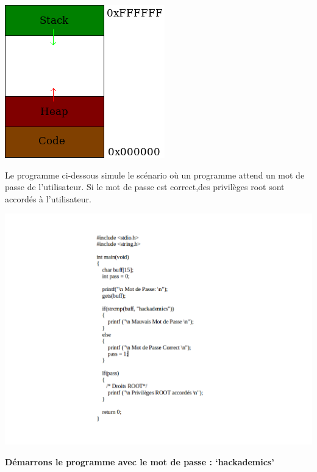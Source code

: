 \begin{center}
\includegraphics[scale=0.5]{Application/assets/stack.png}
\end{center}

\begin{flushleft}
Le programme ci-dessous simule le scénario où un programme attend un mot de passe de l'utilisateur. Si le mot de passe est correct,des privilèges root sont accordés à l'utilisateur.
\end{flushleft}

\begin{center}
\includegraphics[scale=0.5]{Application/assets/codebo.png}
\end{center}

\begin{flushleft}
\textbf{Démarrons le programme avec le mot de passe : ‘hackademics'}
\end{flushleft}

